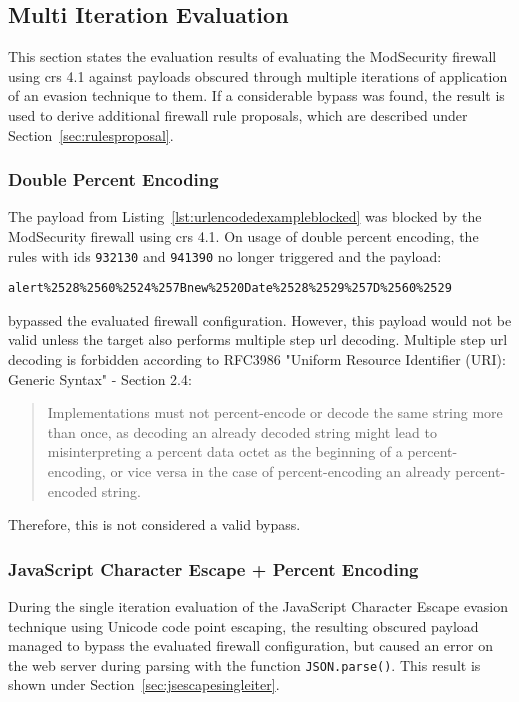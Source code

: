\subsection{Multi Iteration Evaluation}
\label{sec:multiiteration}
This section states the evaluation results of evaluating the ModSecurity firewall using \acrshort{crs} 4.1 against payloads obscured through multiple iterations of application of an evasion technique to them. If a considerable bypass was found, the result is used to derive additional firewall rule proposals, which are described under Section~\ref{sec:rulesproposal}.

\subsubsection{Double Percent Encoding}
\label{sec:doublepercenc}
The payload from Listing~\ref{lst:urlencodedexampleblocked} was blocked by the ModSecurity firewall using \acrshort{crs} 4.1.
On usage of double percent encoding, the rules with ids \verb|932130| and \verb|941390| no longer triggered and the payload:

\begin{lstlisting}[style=basicStyle]
alert%2528%2560%2524%257Bnew%2520Date%2528%2529%257D%2560%2529
\end{lstlisting}
bypassed the evaluated firewall configuration.
However, this payload would not be valid unless the target also performs multiple step url decoding. Multiple step url decoding is forbidden according to RFC3986 "Uniform Resource Identifier (URI): Generic Syntax" - Section 2.4:
\begin{quote}
	Implementations must not
	percent-encode or decode the same string more than once, as decoding
	an already decoded string might lead to misinterpreting a percent
	data octet as the beginning of a percent-encoding, or vice versa in
	the case of percent-encoding an already percent-encoded string. \cite{rfc3986/sec2.4}
\end{quote}
Therefore, this is not considered a valid bypass.


\subsubsection{JavaScript Character Escape + Percent Encoding}
\label{sec:jsencpercenc}
During the single iteration evaluation of the JavaScript Character Escape evasion technique using Unicode code point escaping, the resulting obscured payload managed to bypass the evaluated firewall configuration, but caused an error on the web server during parsing with the function \verb|JSON.parse()|. This result is shown under Section~\ref{sec:jsescapesingleiter}.

